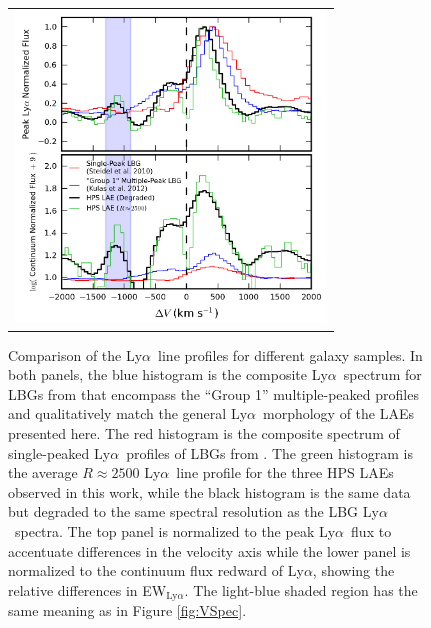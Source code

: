 \documentclass{emulateapj}
\newcommand{\lya}{Ly$\alpha$}
\def\ewlya{EW$_{\mathrm{Ly}\alpha}$}
\begin{document}
	\begin{figure}[t]
	\begin{center}
	\begin{tabular}{c}
	\includegraphics[width=8.25cm]{f4.png}
	\end{tabular}
	\end{center}
	\caption[example] 
	{ \label{fig:K12G1Comparison} 
	Comparison of the \lya\ line profiles for different galaxy samples. In both panels, the blue histogram is the composite \lya\ spectrum for LBGs from \citet{kulas2012} that encompass the ``Group 1'' multiple-peaked profiles and qualitatively match the general \lya\ morphology of the LAEs presented here. The red histogram is the composite spectrum of single-peaked \lya\ profiles of LBGs from \citet{steidel2010}. The green histogram is the average $R\approx2500$ \lya\ line profile for the three HPS LAEs observed in this work, while the black histogram is the same data but degraded to the same spectral resolution as the LBG \lya\ spectra. The top panel is normalized to the peak \lya\ flux to accentuate differences in the velocity axis while the lower panel is normalized to the continuum flux redward of \lya, showing the relative differences in \ewlya. The light-blue shaded region has the same meaning as in Figure \ref{fig:VSpec}.}
	\end{figure} 
\end{document}
